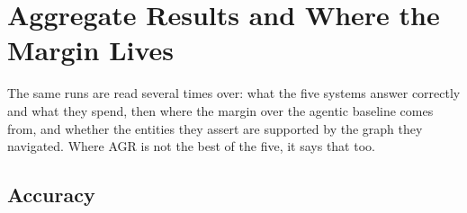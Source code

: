 %
%
%
%
%

\section{Aggregate Results and Where the Margin Lives}\label{sec:results}

The same runs are read several times over: what the five systems answer
correctly and what they spend, then where the margin over the agentic
baseline comes from, and whether the entities they assert are supported
by the graph they navigated. Where AGR is not the best of the five, it
says that too.

\subsection{Accuracy}\label{sec:accuracy}

